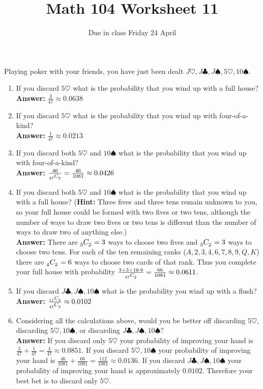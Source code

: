 \documentclass[12pt]{article}
\author{}\date{Due in class Friday 24 April}
\title{Math 104 Worksheet 11}\author{}
\newcommand\ncr[2]{\tensor[_{#1}]C{_{#2}}}
\begin{document}
\maketitle
\pagestyle{empty}
Playing poker with your friends,
you have just been dealt
$J\heartsuit,J\clubsuit,J\spadesuit,5\heartsuit,10\spadesuit$.
\begin{enumerate}
\item If you discard $5\heartsuit$ what is the probability
that you wind up with a full house?\\
{\bf Answer:} $\frac{3}{47}\approx 0.0638$
\item If you discard $5\heartsuit$ what is the probability
that you wind up with four-of-a-kind?\\
{\bf Answer:} $\frac{1}{47}\approx 0.0213$
\item If you discard both $5\heartsuit$ and $10\spadesuit$
what is the probability that you wind up with four-of-a-kind?\\
{\bf Answer:} $\frac{46}{\ncr{47}{2}}=\frac{46}{1081}\approx 0.0426$
\item If you discard both $5\heartsuit$ and $10\spadesuit$
what is the probability that you wind up with a full house?
({\bf Hint:} Three fives and three
tens remain unknown to you, so your full house could be formed
with two fives or two tens, although the number of ways
to draw two fives or two tens is different than the number
of ways to draw two of anything else.)\\
{\bf Answer:} There are $\ncr{3}{2}=3$ ways to choose
two fives and $\ncr{3}{2}=3$ ways to choose two tens.
For each of the ten remaining ranks ($A,2,3,4,6,7,8,9,Q,K$)
there are $\ncr{4}{2}=6$ ways to choose two cards of that rank.
Thus you complete your full house with probability
$\frac{3+3+10\cdot 6}{\ncr{47}{2}}=\frac{66}{1081}\approx 0.0611$.
\item If you discard $J\clubsuit,J\spadesuit,10\spadesuit$
what is the probability you wind up with a flush?\\
{\bf Answer:} $\frac{\ncr{11}{3}}{\ncr{47}{3}}\approx 0.0102$
\item Considering all the calculations above, would you be better
off discarding
$5\heartsuit$,
discarding $5\heartsuit,10\spadesuit$, or
discarding $J\clubsuit,J\spadesuit,10\spadesuit$?\\
{\bf Answer:} 
If you discard only $5\heartsuit$ your probability
of improving your hand is $\frac{3}{47}+\frac{1}{47}=\frac{4}{47}
\approx 0.0851$.
If you discard $5\heartsuit,10\spadesuit$ your probability
of improving your hand is $\frac{46}{1081}+\frac{66}{1081}
=\frac{112}{1081}\approx 0.0136$.
If you discard $J\clubsuit,J\spadesuit,10\spadesuit$
your probability of improving your hand is approximately $0.0102$.
Therefore your best bet is to discard only $5\heartsuit$.
\end{enumerate}
\end{document}
